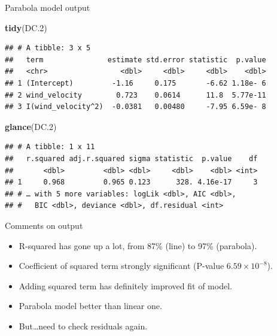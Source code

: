 \documentclass[ignorenonframetext,]{beamer}
\newenvironment{Shaded}{\begin{snugshade}}{\end{snugshade}}
\newcommand{\FloatTok}[1]{\textcolor[rgb]{0.00,0.00,0.81}{#1}}
\newcommand{\KeywordTok}[1]{\textcolor[rgb]{0.13,0.29,0.53}{\textbf{#1}}}
\newcommand{\NormalTok}[1]{#1}
\providecommand{\tightlist}{%
  \setlength{\itemsep}{0pt}\setlength{\parskip}{0pt}}
\begin{document}
\begin{frame}[fragile]{Parabola model output}
\protect\hypertarget{parabola-model-output}{}

\begin{Shaded}
\begin{Highlighting}[]
\KeywordTok{tidy}\NormalTok{(DC}\FloatTok{.2}\NormalTok{)}
\end{Highlighting}
\end{Shaded}

\begin{verbatim}
## # A tibble: 3 x 5
##   term               estimate std.error statistic  p.value
##   <chr>                 <dbl>     <dbl>     <dbl>    <dbl>
## 1 (Intercept)         -1.16     0.175       -6.62 1.18e- 6
## 2 wind_velocity        0.723    0.0614      11.8  5.77e-11
## 3 I(wind_velocity^2)  -0.0381   0.00480     -7.95 6.59e- 8
\end{verbatim}

\begin{Shaded}
\begin{Highlighting}[]
\KeywordTok{glance}\NormalTok{(DC}\FloatTok{.2}\NormalTok{)}
\end{Highlighting}
\end{Shaded}

\begin{verbatim}
## # A tibble: 1 x 11
##   r.squared adj.r.squared sigma statistic  p.value    df
##       <dbl>         <dbl> <dbl>     <dbl>    <dbl> <int>
## 1     0.968         0.965 0.123      328. 4.16e-17     3
## # … with 5 more variables: logLik <dbl>, AIC <dbl>,
## #   BIC <dbl>, deviance <dbl>, df.residual <int>
\end{verbatim}

\end{frame}

\begin{frame}{Comments on output}
\protect\hypertarget{comments-on-output}{}

\begin{itemize}
\tightlist
\item
  R-squared has gone up a lot, from 87\% (line) to 97\% (parabola).
\item
  Coefficient of squared term strongly significant (P-value
  \(6.59 \times 10^{−8}\)).
\item
  Adding squared term has definitely improved fit of model.
\item
  Parabola model better than linear one.
\item
  But\ldots{}need to check residuals again.
\end{itemize}

\end{frame}
\end{document}
